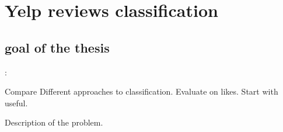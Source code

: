 \chapter{Yelp reviews classification}

\section{goal of the thesis}:

Compare Different approaches to classification.  Evaluate on likes. Start with useful.

Description of the problem.
